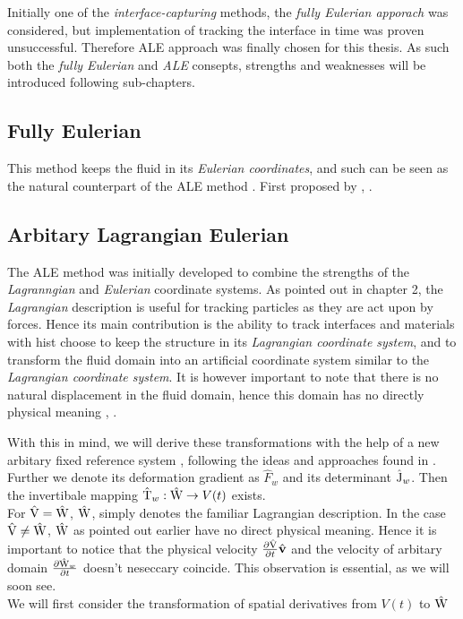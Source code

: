 Initially one of the \textit{interface-capturing } methods, the \textit{fully Eulerian apporach } was considered, but implementation of tracking the interface in time was proven unsuccessful. Therefore ALE approach was finally chosen for this thesis. As such both the \textit{fully Eulerian} and \textit{ALE} consepts, strengths and weaknesses will be introduced following sub-chapters. \\

\subsection{Fully Eulerian}
This method keeps the fluid in its \textit{Eulerian coordinates}, and such can be seen as the natural counterpart of the ALE method \cite{Wick2013}. First proposed by , \cite{Dunne2006}.

\subsection{Arbitary Lagrangian Eulerian}
The ALE method was initially developed to combine the strengths of the \textit{Lagranngian} and \textit{Eulerian} coordinate systems. As pointed out in chapter 2, the \textit{Lagrangian} description is useful for tracking particles as they are act upon by forces. Hence its main contribution is the ability to track interfaces and materials with hist
  choose to keep the structure in its \textit{Lagrangian coordinate system}, and to transform the fluid domain into an artificial coordinate system similar to the \textit{Lagrangian coordinate system}. It is however important to note that there is no natural displacement in the fluid domain, hence this domain has no directly physical meaning \cite{Richter2010a}, \cite{Donea2004}. 
 
With this in mind, we will derive these transformations with the help of a new arbitary fixed reference system , following the ideas and approaches found in \cite{Richter2016}. Further we denote its deformation gradient as $\hat{F}_w$ and its determinant $\text{\^{J}}_w$. Then the invertibale mapping $\text{\^{T}}_w : \text{\^{W}} \rightarrow V(t)$ exists. \\
For $\text{\^{V}} = \text{\^{W}}$, $\text{\^{W}}$, simply denotes the familiar Lagrangian description.
In the case $\text{\^{V}} \neq \text{\^{W}}$, $\text{\^{W}}$ as pointed out earlier have no direct physical meaning.  Hence it is important to notice that the physical velocity $\pder{\ha{V}}{t} \hat{v}$ and the velocity of arbitary domain $\frac{\partial \text{\^{W}}_w}{\partial t}$ doesn't neseccary coincide. This observation is essential, as we will soon see. \\
We will first consider the transformation of spatial derivatives from $V(t)$ to $\text{\^{W}}$ \\


